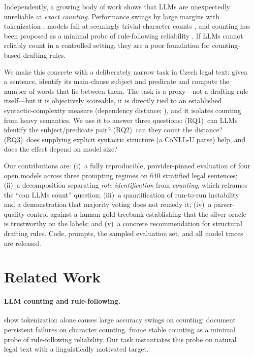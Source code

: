 \documentclass[11pt]{article}
\begin{document}
Independently, a growing body of work shows that LLMs are unexpectedly unreliable at \emph{exact
counting}. Performance swings by large margins with tokenization \citep{zhang2024counting}, models
fail at seemingly trivial character counts \citep{fu2024count}, and counting has been proposed as a
minimal probe of rule-following reliability \citep{dai2026rulefollowing}. If LLMs cannot reliably
count in a controlled setting, they are a poor foundation for counting-based drafting rules.

We make this concrete with a deliberately narrow task in Czech legal text: given a sentence,
identify its main-clause subject and predicate and compute the number of words that lie between
them. The task is a proxy---not a drafting rule itself---but it is objectively scoreable, it is
directly tied to an established syntactic-complexity measure (dependency distance;
\citealp{gao2024dependency}), and it isolates counting from heavy semantics. We use it to answer
three questions: (RQ1)~can LLMs identify the subject/predicate pair? (RQ2)~can they count the
distance? (RQ3)~does supplying explicit syntactic structure (a CoNLL-U parse) help, and does the
effect depend on model size?

Our contributions are: (i)~a fully reproducible, provider-pinned evaluation of four open models
across three prompting regimes on 640 stratified legal sentences; (ii)~a decomposition separating
\emph{role identification} from \emph{counting}, which reframes the ``can LLMs count'' question;
(iii)~a quantification of run-to-run instability and a demonstration that majority voting does not
remedy it; (iv)~a parser-quality control against a human gold treebank establishing that the
silver oracle is trustworthy on the labels; and (v)~a concrete recommendation for structural
drafting rules. Code, prompts, the sampled evaluation set, and all model traces are released.

\section{Related Work}

\paragraph{LLM counting and rule-following.} \citet{zhang2024counting} show tokenization alone
causes large accuracy swings on counting; \citet{fu2024count} document persistent failures on
character counting. \citet{dai2026rulefollowing} frame stable counting as a minimal probe of
rule-following reliability. Our task instantiates this probe on natural legal text with a
linguistically motivated target.
\end{document}
